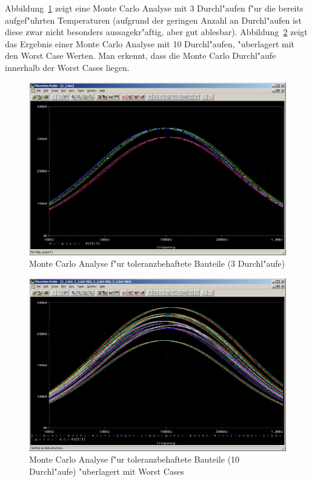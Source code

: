 Abbildung~\ref{fig:3_2_2_mc_fT} zeigt eine Monte Carlo Analyse mit 3 Durchl"aufen f"ur die bereits aufgef"uhrten Temperaturen (aufgrund der geringen Anzahl an Durchl"aufen ist diese zwar nicht besonders aussagekr"aftig, aber gut ablesbar). Abbildung~\ref{fig:3_2_2_wc_mc} zeigt das Ergebnis einer Monte Carlo Analyse mit 10 Durchl"aufen, "uberlagert mit den Worst Case Werten. Man erkennt, dass die Monte Carlo Durchl"aufe innerhalb der Worst Cases liegen.

\begin{figure}%
	\centering
	\includegraphics[width=\textwidth]{fig/bsp2/3_2_2_mc_fT.PNG}
	\caption{Monte Carlo Analyse f"ur toleranzbehaftete Bauteile (3 Durchl"aufe)}
	\label{fig:3_2_2_mc_fT}
\end{figure}

\begin{figure}%
	\centering
	\includegraphics[width=\textwidth]{fig/bsp2/3_2_2_wc_mc.PNG}
	\caption{Monte Carlo Analyse f"ur toleranzbehaftete Bauteile (10 Durchl"aufe) "uberlagert mit Worst Cases}
	\label{fig:3_2_2_wc_mc}
\end{figure}

